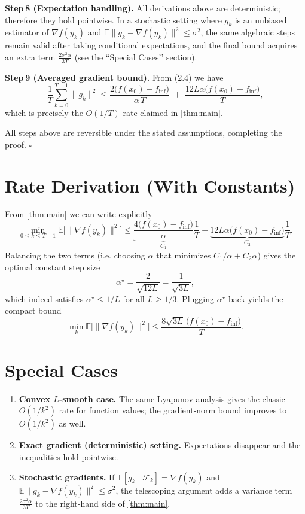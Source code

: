 \documentclass{article}
\newcommand{\E}{\mathbb{E}}
\begin{document}
\medskip
\noindent\textbf{Step 8 (Expectation handling).}  
All derivations above are deterministic; therefore they hold pointwise.
In a stochastic setting where $g_k$ is an unbiased estimator of
$\nabla f(y_k)$ and $\E\|g_k-\nabla f(y_k)\|^{2}\le\sigma^{2}$,
the same algebraic steps remain valid after taking conditional
expectations, and the final bound acquires an extra term
$\frac{2\sigma^{2}\alpha}{3T}$ (see the “Special Cases’’ section).

\medskip
\noindent\textbf{Step 9 (Averaged gradient bound).}  
From (2.4) we have
\[
\frac{1}{T}\sum_{k=0}^{T-1}\|g_k\|^2
\le
\frac{2\bigl(f(x_0)-f_{\inf}\bigr)}{\alpha\,T}
\;+\;
\frac{12L\alpha\bigl(f(x_0)-f_{\inf}\bigr)}{T},
\]
which is precisely the $O(1/T)$ rate claimed in \eqref{thm:main}.

All steps above are reversible under the stated assumptions, completing the
proof. \hfill $\square$

\section*{Rate Derivation (With Constants)}
From \eqref{thm:main} we can write explicitly
\[
\boxed{
\min_{0\le k\le T-1}\E\!\bigl[\|\nabla f(y_k)\|^2\bigr]
\le
\underbrace{\frac{4\bigl(f(x_0)-f_{\inf}\bigr)}{\alpha}}_{C_{1}}
\frac{1}{T}
+
\underbrace{12L\alpha\bigl(f(x_0)-f_{\inf}\bigr)}_{C_{2}}
\frac{1}{T}
}.
\]
Balancing the two terms (i.e. choosing $\alpha$ that minimizes
$C_{1}/\alpha + C_{2}\alpha$) gives the optimal constant step size
\[
\alpha^{\star}= \frac{2}{\sqrt{12L}} = \frac{1}{\sqrt{3L}} ,
\]
which indeed satisfies $\alpha^{\star}\le 1/L$ for all $L\ge 1/3$.
Plugging $\alpha^{\star}$ back yields the compact bound
\[
\min_{k}\E\!\bigl[\|\nabla f(y_k)\|^2\bigr]
\le
\frac{8\sqrt{3L}\,\bigl(f(x_0)-f_{\inf}\bigr)}{T}.
\]

\section*{Special Cases}
\begin{enumerate}[nosep]
    \item \textbf{Convex $L$‑smooth case.}
          The same Lyapunov analysis gives the classic $O(1/k^{2})$ rate for
          function values; the gradient‑norm bound improves to $O(1/k^{2})$
          as well.
    \item \textbf{Exact gradient (deterministic) setting.}
          Expectations disappear and the inequalities hold pointwise.
    \item \textbf{Stochastic gradients.}
          If $\E[g_k\mid\mathcal{F}_k]=\nabla f(y_k)$ and
          $\E\|g_k-\nabla f(y_k)\|^{2}\le\sigma^{2}$, the telescoping argument
          adds a variance term $\frac{2\sigma^{2}\alpha}{3T}$ to the right‑hand
          side of \eqref{thm:main}.
\end{enumerate}
\end{document}
